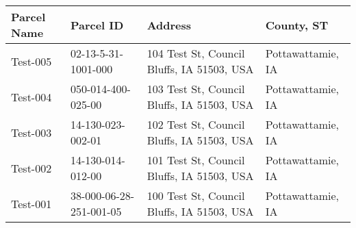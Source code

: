 \documentclass[a4paper,12pt]{article}
\begin{document}
\begin{tabularx}{\textwidth}{@{} l l X l @{}}
    \toprule
    \textbf{Parcel Name} & \textbf{Parcel ID} & \textbf{Address} & \textbf{County, ST} \\
    \midrule
    Test-005 & 02-13-5-31-1001-000 & 104 Test St, Council Bluffs, IA 51503, USA & Pottawattamie, IA \\ \hline
Test-004 & 050-014-400-025-00 & 103 Test St, Council Bluffs, IA 51503, USA & Pottawattamie, IA \\ \hline
Test-003 & 14-130-023-002-01 & 102 Test St, Council Bluffs, IA 51503, USA & Pottawattamie, IA \\ \hline
Test-002 & 14-130-014-012-00 & 101 Test St, Council Bluffs, IA 51503, USA & Pottawattamie, IA \\ \hline
Test-001 & 38-000-06-28-251-001-05 & 100 Test St, Council Bluffs, IA 51503, USA & Pottawattamie, IA \\ \hline
    \bottomrule
\end{tabularx}
\end{document}
